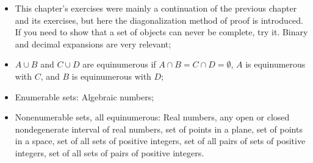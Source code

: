 \begin{exercise}[2.11]
\end{exercise}

\begin{exercise}[2.12]
\end{exercise}

\begin{exercise}[2.13]
\end{exercise}

\begin{summary}
  \begin{itemize}
    \item This chapter's exercises were mainly a continuation of the previous chapter and its exercises, but here the diagonalization method of proof is introduced.
    If you need to show that a set of objects can never be complete, try it.
    Binary and decimal expansions are very relevant;
    \item $A\cup B$ and $C\cup D$ are equinumerous if $A\cap B = C\cap D = \emptyset$, $A$ is equinumerous with $C$, and $B$ is equinumerous with $D$;
    \item Enumerable sets: Algebraic numbers;
    \item Nonenumerable sets, all equinumerous: Real numbers, any open or closed nondegenerate interval of real numbers, set of points in a plane, set of points in a space, set of all sets of positive integers, set of all pairs of sets of positive integers, set of all sets of pairs of positive integers.
  \end{itemize}
\end{summary}
